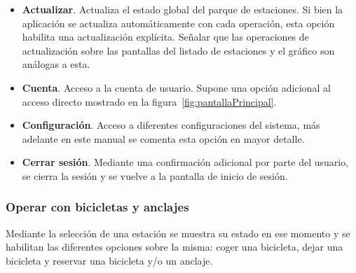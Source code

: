 \begin{itemize}
	\item \textbf{Actualizar}. Actualiza el estado global del parque de estaciones. Si bien la aplicación se actualiza automáticamente con cada operación, esta opción habilita una actualización explícita. Señalar que las operaciones de actualización sobre las pantallas del listado de estaciones y el gráfico son análogas a esta.
	\item \textbf{Cuenta}. Acceso a la cuenta de usuario. Supone una opción adicional al acceso directo mostrado en la figura~\ref{fig:pantallaPrincipal}.
	\item \textbf{Configuración}. Acceso a diferentes configuraciones del sistema, más adelante en este manual se comenta esta opción en mayor detalle.
	\item \textbf{Cerrar sesión}. Mediante una confirmación adicional por parte del usuario, se cierra la sesión y se vuelve a la pantalla de inicio de sesión.
\end{itemize}

\subsubsection{Operar con bicicletas y anclajes}

Mediante la selección de una estación se muestra su estado en ese momento y se habilitan las diferentes opciones sobre la misma: coger una bicicleta, dejar una bicicleta y reservar una bicicleta y/o un anclaje.

